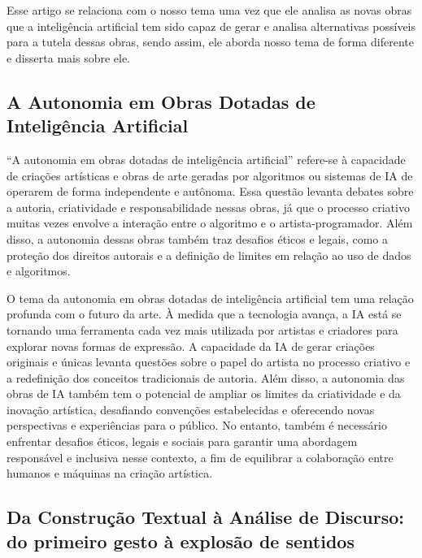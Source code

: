 \documentclass[12pt]{article}
\begin{document}
    Esse artigo se relaciona com o nosso tema uma vez que ele analisa as novas obras que a inteligência artificial tem sido capaz de gerar e analisa alternativas possíveis para a tutela dessas obras, sendo assim, ele aborda nosso tema de forma diferente e disserta mais sobre ele.


    \subsection{A Autonomia em Obras Dotadas de Inteligência Artificial}
	\label{sec:trab_relacionados}

    “A autonomia em obras dotadas de inteligência artificial” refere-se à capacidade de criações artísticas e obras de arte geradas por algoritmos ou sistemas de IA de operarem de forma independente e autônoma. Essa questão levanta debates sobre a autoria, criatividade e responsabilidade nessas obras, já que o processo criativo muitas vezes envolve a interação entre o algoritmo e o artista-programador. Além disso, a autonomia dessas obras também traz desafios éticos e legais, como a proteção dos direitos autorais e a definição de limites em relação ao uso de dados e algoritmos.
    
    O tema da autonomia em obras dotadas de inteligência artificial tem uma relação profunda com o futuro da arte. À medida que a tecnologia avança, a IA está se tornando uma ferramenta cada vez mais utilizada por artistas e criadores para explorar novas formas de expressão. A capacidade da IA de gerar criações originais e únicas levanta questões sobre o papel do artista no processo criativo e a redefinição dos conceitos tradicionais de autoria. Além disso, a autonomia das obras de IA também tem o potencial de ampliar os limites da criatividade e da inovação artística, desafiando convenções estabelecidas e oferecendo novas perspectivas e experiências para o público. No entanto, também é necessário enfrentar desafios éticos, legais e sociais para garantir uma abordagem responsável e inclusiva nesse contexto, a fim de equilibrar a colaboração entre humanos e máquinas na criação artística.


    \subsection{Da Construção Textual à Análise de Discurso: do primeiro gesto à explosão de sentidos}
	\label{sec:trab_relacionados}
\end{document}
